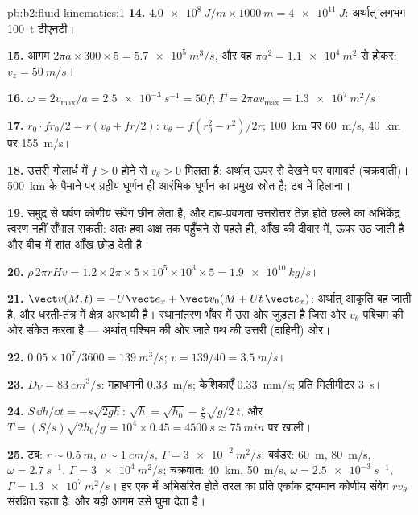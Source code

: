 \begin{solution}{pb:b2:fluid-kinematics:1}
\textbf{14.} $\qty{4.0e8}{J/m} \times \qty{1000}{m} = \qty{4e11}{J}$: अर्थात् लगभग
\qty{100}{t} टीएनटी।

\textbf{15.} आगम $2\pi a \times 300 \times 5 = \qty{5.7e5}{m^3/s}$, और वह
$\pi a^2 = \qty{1.1e4}{m^2}$ से होकर: $v_z = \qty{50}{m/s}$।

\textbf{16.} $\omega = 2v_{\max}/a = \qty{2.5e-3}{s^{-1}} = 50f$; $\Gamma = 2\pi av_{\max}
= \qty{1.3e7}{m^2/s}$।

\textbf{17.} $r_0\cdot fr_0/2 = r(v_\theta + fr/2)$: $v_\theta = f(r_0^2 - r^2)/2r$;
\qty{100}{km} पर \qty{60}{m/s}, \qty{40}{km} पर \qty{155}{m/s}।

\textbf{18.} उत्तरी गोलार्ध में $f > 0$ होने से $v_\theta > 0$ मिलता है:
अर्थात् ऊपर से देखने पर वामावर्त (चक्रवाती)। \qty{500}{km} के पैमाने पर
ग्रहीय घूर्णन ही आरंभिक घूर्णन का प्रमुख स्रोत है; टब में
हिलाना।

\textbf{19.} समुद्र से घर्षण कोणीय संवेग छीन लेता है, और
दाब-प्रवणता उत्तरोत्तर तेज़ होते छल्ले का अभिकेंद्र त्वरण नहीं
सँभाल सकती: अतः हवा अक्ष तक पहुँचने से पहले ही, आँख की दीवार में,
ऊपर उठ जाती है और बीच में शांत आँख छोड़ देती है।

\textbf{20.} $\rho\,2\pi rHv = 1.2 \times 2\pi \times 5 \times 10^5 \times 10^3 \times 5 =
\qty{1.9e10}{kg/s}$।

\textbf{21.} $\vect v(M, t) = -U\vect e_x + \vect v_0(M + Ut\,\vect e_x)$: अर्थात्
आकृति बह जाती है, और धरती-तंत्र में क्षेत्र अस्थायी है।
स्थानांतरण भँवर में उस ओर जुड़ता है जिस ओर $v_\theta$ पश्चिम की ओर
संकेत करता है --- अर्थात् पश्चिम की ओर जाते पथ की उत्तरी (दाहिनी) ओर।

\textbf{22.} $0.05 \times 10^7/3600 = \qty{139}{m^3/s}$; $v = 139/40 = \qty{3.5}{m/s}$।

\textbf{23.} $D_V = \qty{83}{cm^3/s}$: महाधमनी \qty{0.33}{m/s}; केशिकाएँ
\qty{0.33}{mm/s}; प्रति मिलीमीटर \qty{3}{s}।

\textbf{24.} $S\,\dd h/\dd t = -s\sqrt{2gh}$: $\sqrt h = \sqrt{h_0} -
\frac sS\sqrt{g/2}\,t$, और $T = (S/s)\sqrt{2h_0/g} = 10^4 \times 0.45 =
\qty{4500}{s} \approx \qty{75}{min}$ पर खाली।

\textbf{25.} टब: $r \sim \qty{0.5}{m}$, $v \sim \qty{1}{cm/s}$, $\Gamma =
\qty{3e-2}{m^2/s}$; बवंडर: \qty{60}{m}, \qty{80}{m/s}, $\omega = \qty{2.7}{s^{-1}}$,
$\Gamma = \qty{3e4}{m^2/s}$; चक्रवात: \qty{40}{km}, \qty{50}{m/s}, $\omega =
\qty{2.5e-3}{s^{-1}}$, $\Gamma = \qty{1.3e7}{m^2/s}$। हर एक में अभिसरित होते
तरल का प्रति एकांक द्रव्यमान कोणीय संवेग $rv_\theta$ संरक्षित रहता है:
और यही आगम उसे घुमा देता है।
\end{solution}
